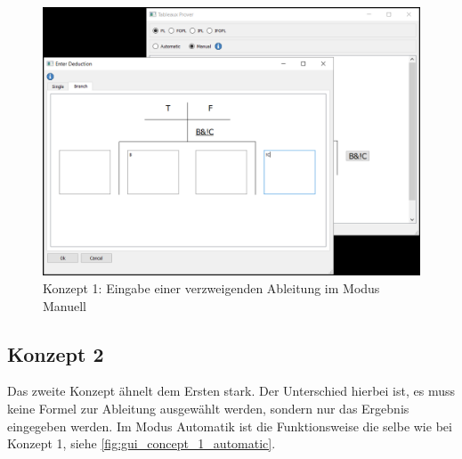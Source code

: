\begin{figure}[H]
\begin{center}
\includegraphics[scale=0.7]{images/gui_concept_1_manual_enter_branch.png}
\caption{Konzept 1: Eingabe einer verzweigenden Ableitung im Modus Manuell}
\label{fig:gui_concept_1_manual_enter_branch}
\end{center}
\end{figure}

\subsection{Konzept 2}
Das zweite Konzept ähnelt dem Ersten stark. Der Unterschied hierbei ist, es muss keine Formel zur Ableitung ausgewählt werden, sondern nur das Ergebnis eingegeben werden. Im Modus Automatik ist die Funktionsweise die selbe wie bei Konzept 1, siehe \autoref{fig:gui_concept_1_automatic}.

